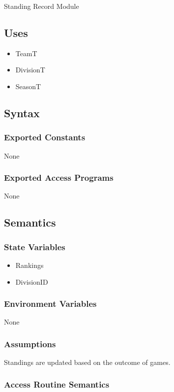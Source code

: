 \documentclass[12pt, titlepage]{article}
\begin{document}
Standing Record Module

\subsection{Uses} 
\begin{itemize} 
  \item TeamT 
  \item DivisionT
  \item SeasonT 
\end{itemize}

\subsection{Syntax}

\subsubsection{Exported Constants} None

\subsubsection{Exported Access Programs} None

\subsection{Semantics}

\subsubsection{State Variables} 
\begin{itemize} 
  \item Rankings
  \item DivisionID 
\end{itemize}

\subsubsection{Environment Variables}

None

\subsubsection{Assumptions}

Standings are updated based on the outcome of games.

\subsubsection{Access Routine Semantics}
\end{document}
